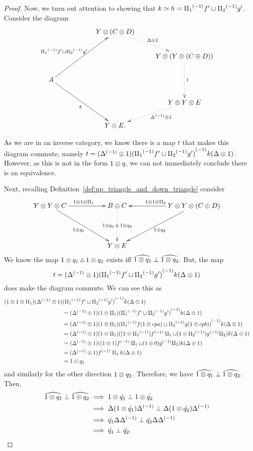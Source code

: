 \begin{proof}
  Now, we turn out attention to showing that $k \overset{\scriptscriptstyle }{\simeq} h = {\amalg_{1}}^{(-1)} f' \sqcup {\amalg_{2}}^{(-1)} g'$. Consider the
  diagram
  \[
    \xymatrix @C=25pt @R=20pt{
      & & Y \* (C\+D) \ar@{.>}[dr]^{\Delta\* 1}\\
      & & & Y \* (Y\* (C\+D)) \ar@{.>}[dd]^{t}\\
      A \ar[uurr]^{\icpa f' \djoin \icpb g'} \ar[ddrr]_{k} \\
      & & & Y \* Y\*E \ar@{.>}[dl]^(.4){\inv{\Delta}\* 1}\\
      && Y\*E.
    }
  \]

  As we are in an inverse category, we know there is a map $t$ that makes this diagram commute,
  namely $t = ({\Delta}^{(-1)}\otimes 1) {({\amalg_{1}}^{(-1)} f' \sqcup {\amalg_{2}}^{(-1)} g')}^{(-1)}k(\Delta \otimes 1)$. However, as this is
  not in the form $1\otimes q$, we can not immediately conclude there is an equivalence.

  Next, recalling Definition~\ref{def:up_triangle_and_down_triangle} consider
  \begin{equation}
    \xymatrix@C+0pt @R+20pt{
      Y\*Y\*C\ar[rr]^{1\*1\*\cpa} \ar[drr]_{1\*q_1} &&B\+C   \ar@{.>}[d]|-{1\*q_1\tjup 1\*q_2}
        && Y\*Y\*(C\+D) \ar[ll]_{1\*1\*\cpb} \ar[dll]^{1\*q_2}\\
      &&Y\*E
      }\label{diag:q1_q2_tjup}
  \end{equation}
  We know the map $1\otimes q_1\operatorname{\vartriangle} 1\otimes q_2$ exists iff $\widehat{1\otimes q_1} \perp \widehat{1\otimes q_2}$. But, the map
  \[
    t = ({\Delta}^{(-1)}\otimes 1) {({\amalg_{1}}^{(-1)} f' \sqcup {\amalg_{2}}^{(-1)} g')}^{(-1)}k(\Delta \otimes 1)
  \]
  does make the diagram commute. We can see this as
  \begin{align*}
    (1\*1\*\cpa)(\inv{\Delta}\* 1)& \inv{(\icpa f' \djoin \icpb g')}k(\Delta \* 1)\\
    &= (\inv{\Delta}\* 1) (1\*\cpa)\inv{(\icpa f' \djoin \icpb g')}k(\Delta \* 1)\\
    &= (\inv{\Delta}\* 1) (1\*\cpa)\inv{(\icpa f(1\*cpa) \djoin \icpb g(1\*cpb))}k(\Delta \* 1)\\
    &= (\inv{\Delta}\* 1) (1\*\cpa)((1\*\icpa) \inv{f}\cpa \djoin (1\*\icpb) \inv{g}\cpb) k (\Delta \* 1)\\
    &= (\inv{\Delta}\* 1) ((1\*1) \inv{f}\cpa \djoin (1\*0) \inv{g}\cpb) k (\Delta \* 1)\\ %
    &= (\inv{\Delta}\* 1) \inv{f} \cpa k(\Delta \* 1)\\
    &= 1\*q_1
  \end{align*}
  and similarly for the other direction $1\otimes q_2$. Therefore, we have
  $\widehat{1\otimes q_1} \perp \widehat{1\otimes q_2}$. Then,
  \begin{align*}
    \widehat{1\otimes q_1} \perp \widehat{1\otimes q_2}&\implies 1\otimes\hat{q_1} \perp 1\otimes\hat{q_2}\\
    &\implies \Delta(1\otimes\hat{q_1}){\Delta}^{(-1)} \perp \Delta(1\otimes\hat{q_2}){\Delta}^{(-1)}\\
    &\implies \hat{q_1}\Delta{\Delta}^{(-1)} \perp \hat{q_2}\Delta{\Delta}^{(-1)}\\
    &\implies \hat{q_1} \perp \hat{q_2}.
  \end{align*}


\end{proof}
